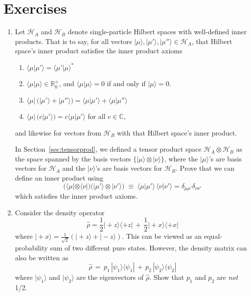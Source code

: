 \documentclass[pra,12pt]{revtex4}
\begin{document}
\section*{Exercises}

\begin{enumerate}
\item Let $\mathscr{H}_A$ and $\mathscr{H}_B$ denote single-particle
  Hilbert spaces with well-defined inner products.  That is to say,
  for all vectors $|\mu\rangle, |\mu'\rangle, |\mu''\rangle \in
  \mathscr{H}_A$, that Hilbert space's inner product satisfies the
  inner product axioms
  \begin{enumerate}
  \item $\langle \mu|\mu' \rangle = \langle\mu'|\mu\rangle^*$
  \item $\langle \mu|\mu \rangle \in \mathbb{R}^+_0$, and $\langle \mu|\mu \rangle = 0$ if and only if $|\mu\rangle = 0$.
  \item $\langle\mu| \, \big(|\mu'\rangle + |\mu'' \rangle\big)
    = \langle \mu|\mu'\rangle + \langle \mu|\mu''\rangle$
  \item $\langle \mu | \,\big(c|\mu'\rangle\big) = c\langle\mu|\mu'\rangle$ for all $c\in\mathbb{C}$,
  \end{enumerate}
  and likewise for vectors from $\mathscr{H}_B$ with that Hilbert
  space's inner product.

  In Section~\ref{sec:tensorprod}, we defined a tensor product space
  $\mathscr{H}_A\otimes\mathscr{H}_B$ as the space spanned by the
  basis vectors $\{|\mu\rangle\otimes|\nu\rangle\}$, where the
  $|\mu\rangle$'s are basis vectors for $\mathscr{H}_A$ and the
  $|\nu\rangle$'s are basis vectors for $\mathscr{H}_B$.  Prove that
  we can define an inner product using
  \begin{equation}
    \Big(\langle\mu| \otimes \langle\nu| \Big)
    \Big(|\mu'\rangle \otimes |\nu'\rangle\Big)
    \;\equiv\; \langle\mu|\mu'\rangle
    \, \langle\nu|\nu'\rangle = \delta_{\mu\mu'}\delta_{\nu\nu'}
  \end{equation}
  which satisfies the inner product axioms.
  \label{ex:innerprod}

\item Consider the density operator
  \begin{equation}
    \hat{\rho} = \frac{1}{2} |\!+\!z\rangle \langle+z|
    \,+\, \frac{1}{2} |\!+\!x\rangle \langle+x|
  \end{equation}
  where $|\!+\!x\rangle = \frac{1}{\sqrt{2}} \left(|\!+\!z\rangle +
  |\!-\!z\rangle\right)$.  This can be viewed as an equal-probability
  sum of two different pure states.  However, the density matrix can
  also be written as
  \begin{equation}
    \hat{\rho} \,=\, p_1\, |\psi_1\rangle \langle \psi_1|
    \,+\, p_2\, |\psi_2\rangle \langle\psi_2|
  \end{equation}
  where $|\psi_{1}\rangle$ and $|\psi_{2}\rangle$ are the eigenvectors
  of $\hat{\rho}$.  Show that $p_1$ and $p_2$ are \textit{not} 1/2.
  \label{ex:rho_decomp}



\end{enumerate}
\end{document}
